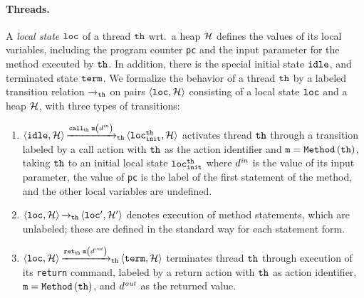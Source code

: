 \paragraph{Threads.}
A {\it local state} ${\tt loc}$ of a thread ${\tt th}$
wrt.\ a heap ${\mathcal H}$ defines 
the values of its local variables, including the program counter
{\tt pc} and the input parameter for the method executed by ${\tt th}$.
In addition, there is the special initial state ${\tt idle}$,
and terminated state ${\tt term}$.
%
%
We formalize the behavior of a thread ${\tt th}$ by
a labeled transition relation ${\xrightarrow{}{}}_{\!\!{\tt th}}$
on pairs $\left\langle{\tt loc},{\mathcal H}\right\rangle$ consisting of a local state
${\tt loc}$ and a heap ${\mathcal H}$, with three types of transitions:
%
\begin{enumerate}
\item
$\left\langle{\tt idle},{\mathcal H}\right\rangle
{\xrightarrow{{\mathtt{call}_{{\tt th}}\; {\tt m}\left(d^{\it in}\right)}}{}}_{\!\!{\tt th}}
\left\langle{\tt loc}_{\tt init}^{{\tt th}},{\mathcal H}\right\rangle$ activates
thread ${\tt th}$ through a transition
labeled by a call action with ${\tt th}$ as the action identifier and
${\tt m}={\tt Method}\left({\tt th}\right)$, taking ${\tt th}$
to an initial local state ${\tt loc}_{\tt init}^{{\tt th}}$
where $d^{\it in}$ is the value of its input parameter,
the value of {\tt pc} is the label of the first statement of the method, and
the other local variables are undefined.
\item
$\left\langle{\tt loc},{\mathcal H}\right\rangle{\xrightarrow{}{}}_{\!\!{\tt th}}\left\langle{\tt loc}',{\mathcal H}'\right\rangle$
  denotes execution of method statements, which are unlabeled; these are defined
  in the standard way for each statement form.
%
%
\item 
$\left\langle{\tt loc},{\mathcal H}\right\rangle{\xrightarrow{\mathtt{ret}_{{\tt th}}\; {\tt m}\left(d^{\it out}\right)}{}}_{\!\!{\tt th}}
\left\langle{\tt term},{\mathcal H}\right\rangle$ terminates
thread ${\tt th}$ through execution of its {\tt return} command, labeled
by a return action with ${\tt th}$ as action identifier,
${\tt m}={\tt Method}\left({\tt th}\right)$, and $d^{\it out}$
as the returned value.
\end{enumerate}


